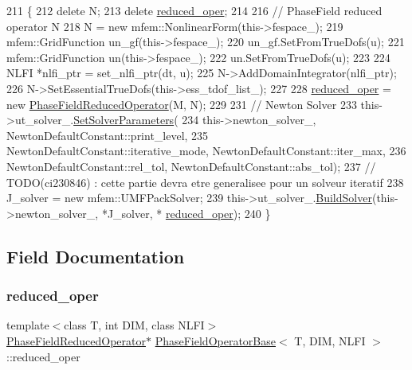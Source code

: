 \begin{DoxyCode}
211                                                                                        \{
212   \textcolor{keyword}{delete} N;
213   \textcolor{keyword}{delete} \hyperlink{classPhaseFieldOperatorBase_a010a3da035afe945635288cc0ab2f0b5}{reduced\_oper};
214 
216   \textcolor{comment}{// PhaseField reduced operator N}
218 \textcolor{comment}{}  N = \textcolor{keyword}{new} mfem::NonlinearForm(this->fespace\_);
219   mfem::GridFunction un\_gf(this->fespace\_);
220   un\_gf.SetFromTrueDofs(u);
221   mfem::GridFunction un(this->fespace\_);
222   un.SetFromTrueDofs(u);
223 
224   NLFI *nlfi\_ptr = set\_nlfi\_ptr(dt, u);
225   N->AddDomainIntegrator(nlfi\_ptr);
226   N->SetEssentialTrueDofs(this->ess\_tdof\_list\_);
227 
228   \hyperlink{classPhaseFieldOperatorBase_a010a3da035afe945635288cc0ab2f0b5}{reduced\_oper} = \textcolor{keyword}{new} \hyperlink{classPhaseFieldReducedOperator}{PhaseFieldReducedOperator}(M, N);
229 
231   \textcolor{comment}{// Newton Solver}
233 \textcolor{comment}{}  this->ut\_solver\_.\hyperlink{classUtilsForSolvers_a5e352c96817ea210dcf3e080c13d4b1d}{SetSolverParameters}(
234       this->newton\_solver\_, NewtonDefaultConstant::print\_level,
235       NewtonDefaultConstant::iterative\_mode, NewtonDefaultConstant::iter\_max,
236       NewtonDefaultConstant::rel\_tol, NewtonDefaultConstant::abs\_tol);
237   \textcolor{comment}{// TODO(ci230846) : cette partie devra etre generalisee pour un solveur iteratif}
238   J\_solver = \textcolor{keyword}{new} mfem::UMFPackSolver;
239   this->ut\_solver\_.\hyperlink{classUtilsForSolvers_a5c76f7ef4f28a5e22f6d07666134aa4d}{BuildSolver}(this->newton\_solver\_, *J\_solver, *
      \hyperlink{classPhaseFieldOperatorBase_a010a3da035afe945635288cc0ab2f0b5}{reduced\_oper});
240 \}
\end{DoxyCode}


\subsection{Field Documentation}
\mbox{\label{classPhaseFieldOperatorBase_a010a3da035afe945635288cc0ab2f0b5}} 
\subsubsection{\texorpdfstring{reduced\+\_\+oper}{reduced\_oper}}
{\footnotesize\ttfamily template$<$class T, int D\+IM, class N\+L\+FI$>$ \\
\hyperlink{classPhaseFieldReducedOperator}{Phase\+Field\+Reduced\+Operator}$\ast$ \hyperlink{classPhaseFieldOperatorBase}{Phase\+Field\+Operator\+Base}$<$ T, D\+IM, N\+L\+FI $>$\+::reduced\+\_\+oper\hspace{0.3cm}{\ttfamily [protected]}}

